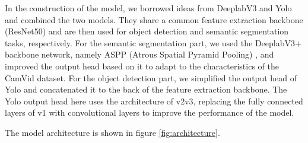 \documentclass[conference]{IEEEtran}
\begin{document}
In the construction of the model, we borrowed ideas from DeeplabV3 and Yolo and combined the two models. They share a common feature extraction backbone (ResNet50) \cite{b0} and are then used for object detection and semantic segmentation tasks, respectively. For the semantic segmentation part, we used the DeeplabV3+ backbone network, namely ASPP (Atrous Spatial Pyramid Pooling) \cite{b2}, and improved the output head based on it to adapt to the characteristics of the CamVid dataset. For the object detection part, we simplified the output head of Yolo and concatenated it to the back of the feature extraction backbone. The Yolo output head here uses the architecture of v2\cite{b6}v3\cite{b1}, replacing the fully connected layers of v1 \cite{b7} with convolutional layers to improve the performance of the model.


The model architecture is shown in figure \ref{fig:architecture}.
\end{document}
